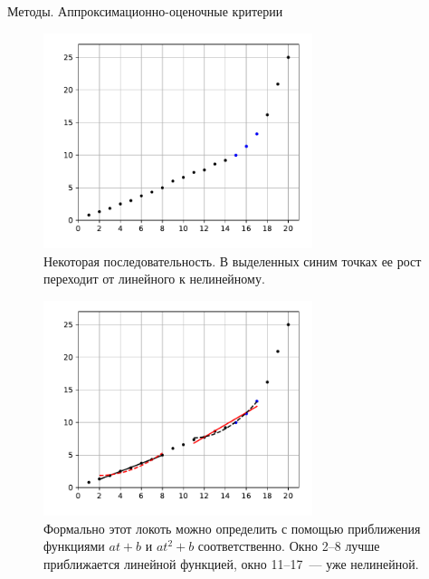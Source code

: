 \documentclass{beamer}
\begin{document}
\begin{frame}{Методы. Аппроксимационно-оценочные критерии}
  \begin{overprint}
    \begin{figure}
      \includegraphics[width=0.7\textwidth]{./figures/elbow.pdf}

      \caption{Некоторая последовательность. В выделенных синим точках ее рост
        переходит от линейного к нелинейному.}
    \end{figure}

    \begin{figure}
      \includegraphics[width=0.7\textwidth]{./figures/elbow-parabolic.pdf}

      \caption{Формально этот локоть можно определить с помощью приближения
        функциями $at+b$ и $at^{2}+b$ соответственно. Окно 2--8 лучше
        приближается линейной функцией, окно 11--17~--- уже нелинейной.
      }
    \end{figure}
  \end{overprint}
\end{frame}
\end{document}
